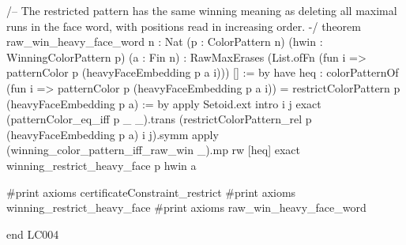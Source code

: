 \documentclass[11pt,reqno]{amsart}
\theoremstyle{definition}
\begin{document}
\begin{LeanCode}
/-- The restricted pattern has the same winning meaning as deleting all
maximal runs in the face word, with positions read in increasing order. -/
theorem raw_win_heavy_face_word {n : Nat} (p : ColorPattern n)
    (hwin : WinningColorPattern p) (a : Fin n) :
    RawMaxErases (List.ofFn (fun i => patternColor p (heavyFaceEmbedding p a i))) [] := by
  have heq : colorPatternOf (fun i => patternColor p (heavyFaceEmbedding p a i)) =
      restrictColorPattern p (heavyFaceEmbedding p a) := by
    apply Setoid.ext
    intro i j
    exact (patternColor_eq_iff p _ _).trans
      (restrictColorPattern_rel p (heavyFaceEmbedding p a) i j).symm
  apply (winning_color_pattern_iff_raw_win _).mp
  rw [heq]
  exact winning_restrict_heavy_face p hwin a

#print axioms certificateConstraint_restrict
#print axioms winning_restrict_heavy_face
#print axioms raw_win_heavy_face_word

end LC004
\end{LeanCode}
\end{document}
